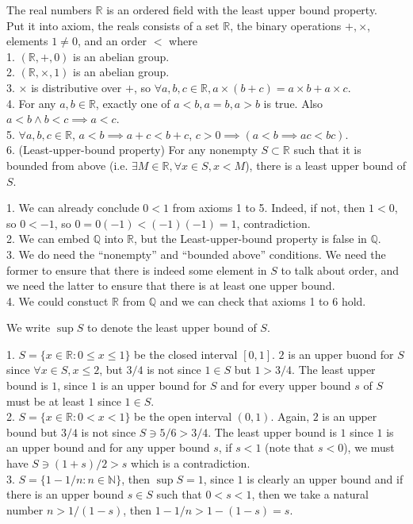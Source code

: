 \begin{definition}
    The real numbers $\mathbb R$ is an ordered field with the least upper bound property.\\
    Put it into axiom, the reals consists of a set $\mathbb R$, the binary operations $+,\times$, elements $1\neq 0$, and an order $<$ where\\
    1. $(\mathbb R,+,0)$ is an abelian group.\\
    2. $(\mathbb R,\times,1)$ is an abelian group.\\
    3. $\times$ is distributive over $+$, so $\forall a,b,c\in\mathbb R,a\times(b+c)=a\times b+a\times c$.\\
    4. For any $a,b\in\mathbb R$, exactly one of $a<b,a=b,a>b$ is true.
    Also $a<b\land b<c\implies a<c$.\\
    5. $\forall a,b,c\in\mathbb R$, $a<b\implies a+c<b+c$, $c>0\implies(a<b\implies ac<bc)$.\\
    6. (Least-upper-bound property) For any nonempty $S\subset\mathbb R$ such that it is bounded from above (i.e. $\exists M\in\mathbb R, \forall x\in S,x<M$), there is a least upper bound of $S$.
\end{definition}
\begin{remark}
    1. We can already conclude $0<1$ from axioms 1 to 5.
    Indeed, if not, then $1<0$, so $0<-1$, so $0=0(-1)<(-1)(-1)=1$, contradiction.\\
    2. We can embed $\mathbb Q$ into $\mathbb R$, but the Least-upper-bound property is false in $\mathbb Q$.\\
    3. We do need the ``nonempty'' and ``bounded above'' conditions.
    We need the former to ensure that there is indeed some element in $S$ to talk about order, and we need the latter to ensure that there is at least one upper bound.\\
    4. We could constuct $\mathbb R$ from $\mathbb Q$ and we can check that axioms 1 to 6 hold.
\end{remark}
We write $\sup S$ to denote the least upper bound of $S$.
\begin{example}
    1. $S=\{x\in\mathbb R:0\le x\le 1\}$ be the closed interval $[0,1]$.
    $2$ is an upper buond for $S$ since $\forall x\in S, x\le 2$, but $3/4$ is not since $1\in S$ but $1>3/4$.
    The least upper bound is $1$, since $1$ is an upper bound for $S$ and for every upper bound $s$ of $S$ must be at least $1$ since $1\in S$.\\
    2. $S=\{x\in\mathbb R:0<x<1\}$ be the open interval $(0,1)$.
    Again, $2$ is an upper bound but $3/4$ is not since $S\ni 5/6>3/4$.
    The least upper bound is $1$ since $1$ is an upper bound and for any upper bound $s$, if $s<1$ (note that $s<0$), we must have $S\ni (1+s)/2>s$ which is a contradiction.\\
    3. $S=\{1-1/n:n\in\mathbb N\}$, then $\sup S=1$, since $1$ is clearly an upper bound and if there is an upper bound $s\in S$ such that $0<s<1$, then we take a natural number $n>1/(1-s)$, then $1-1/n>1-(1-s)=s$.
\end{example}
